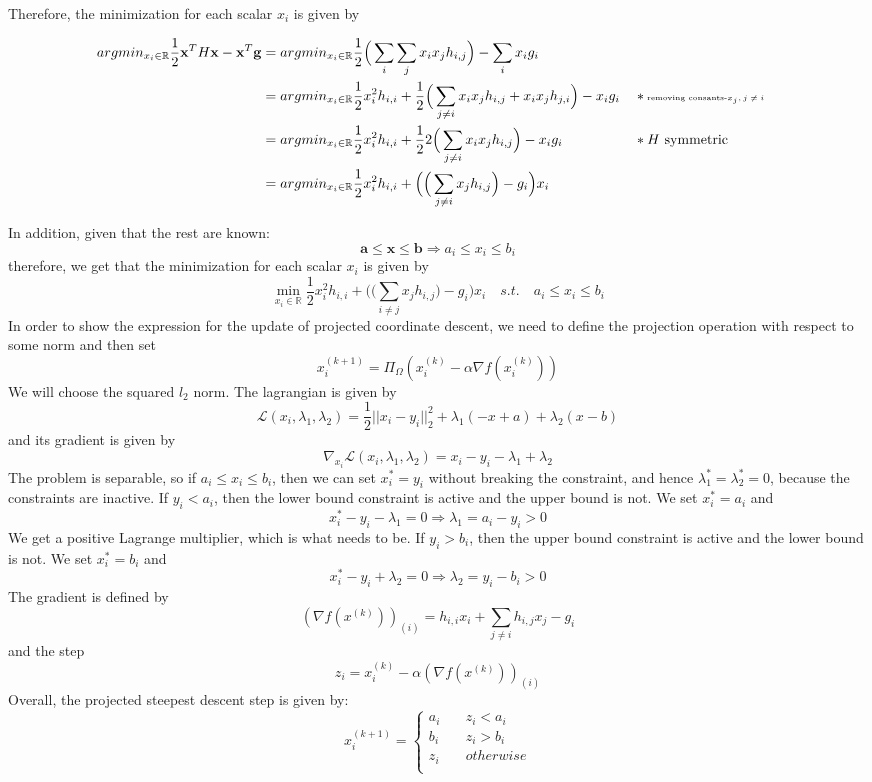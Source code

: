 \documentclass{article}
\begin{document}
\begin{enumerate}[(a)]
Therefore, the minimization for each scalar $x_i$ is given by
\begin{small}
\begin{align*}
argmin_{x_i\in \mathbb{R}}\frac{1}{2}\mathbf{x}^TH \mathbf{x}-\mathbf{x}^T\mathbf{g}
&= argmin_{x_i\in \mathbb{R}}\frac{1}{2}\Big(\sum_i\sum_jx_ix_jh_{i,j}\Big)-\sum_ix_ig_i\\
&= argmin_{x_i\in \mathbb{R}}\frac{1}{2}x_i^2h_{i,i}+\frac{1}{2}\Big(\sum_{j\ne i}x_ix_jh_{i,j}+x_ix_jh_{j,i}\Big)-x_ig_i &&*\text{\tiny removing consants-$x_j, j\ne i$}\\
&= argmin_{x_i\in \mathbb{R}}\frac{1}{2}x_i^2h_{i,i}+\frac{1}{2}2\Big(\sum_{j\ne i}x_ix_jh_{i,j}\Big)-x_ig_i &&*\text{$H$ symmetric}\\
&= argmin_{x_i\in \mathbb{R}}\frac{1}{2}x_i^2h_{i,i}+\Big(\Big(\sum_{j\ne i}x_jh_{i,j}\Big)-g_i\Big)x_i
\end{align*}
\end{small}

In addition, given that the rest are known:
\[\mathbf{a}\le \mathbf{x}\le \mathbf{b} \Rightarrow a_i \le x_i \le b_i\]
therefore, we get  that the minimization for each scalar $x_i$ is given by
\[\min_{x_i\in \mathbb{R}}\frac{1}{2}x_i^2h_{i,i}+\Big(\Big(\sum_{i\ne j}x_jh_{i,j}\Big)-g_i\Big)x_i \quad s.t. \quad a_i \le x_i \le b_i\]
In order to show the expression for the update of projected coordinate descent, we need to define the projection operation with respect to some norm and then set
\[x_i^{(k+1)} = \Pi_\Omega (x_i^{(k)} -\alpha \nabla f(x_i^{(k)})) \]
We will choose the squared $l_2$ norm. The lagrangian is given by
\[\mathcal{L}(x_i, \lambda_1, \lambda_2) = \frac{1}{2}||x_i-y_i||_2^2+\lambda_1(-x+a)+\lambda_2(x-b)       \]
and its gradient is given by
\[  \nabla_{x_i} \mathcal{L}(x_i, \lambda_1, \lambda_2) = x_i-y_i -\lambda_1+\lambda_2     \]
The problem is separable, so if $a_i \le x_i \le b_i$, then we can set $x_i^* = y_i$ without breaking the constraint, and hence $\lambda_1^*=\lambda_2^*=0$, because the
constraints are inactive. If $y_i < a_i$, then the lower bound constraint is active and the upper bound is not. We set $x_i^* = a_i$ and
\[x_i^* - y_i-\lambda_1 = 0 \Rightarrow\lambda_1 = a_i-y_i > 0 \]
We get a positive Lagrange multiplier, which is what needs to be. If $y_i>b_i$, then the upper bound constraint is active and the lower bound is not. We set $x_i^* = b_i$ and
\[x_i^* - y_i+\lambda_2 = 0 \Rightarrow\lambda_2 = y_i-b_i > 0 \]
The gradient is defined by
\[(\nabla f (x^{(k)}))_{(i)} = h_{i,i}x_i+\sum_{j\ne i}  h_{i,j}x_j -g_i   \]
and the step
\[z_i =  x_i^{(k)}-\alpha (\nabla f (x^{(k)}))_{(i)}   \]
Overall, the projected steepest descent step is given by:
\[x_i^{(k+1)} =
\begin{cases}
a_i &\quad z_i <a_i\\
b_i &\quad z_i >b_i\\
z_i &\quad otherwise\\
\end{cases}
\]


\end{enumerate}
\end{document}
